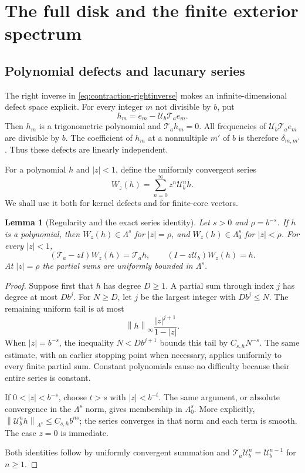 \documentclass[11pt,a4paper]{article}
\numberwithin{equation}{section}
\newtheorem{lemma}[theorem]{Lemma}
\theoremstyle{definition}
\theoremstyle{remark}
\newcommand{\Ta}{\mathcal T_a}
\newcommand{\Ub}{\mathcal U_b}
\newcommand{\norm}[1]{\left\lVert#1\right\rVert}
\newcommand{\smallspace}{\Lambda_0}
\begin{document}
\section{The full disk and the finite exterior spectrum}
\label{sec:spectrum}

\subsection{Polynomial defects and lacunary series}
The right inverse in \eqref{eq:contraction-rightinverse} makes an
infinite-dimensional defect space explicit. For every integer $m$ not
divisible by $b$, put
\begin{equation}
 h_m=e_m-\Ub\Ta e_m.
 \label{eq:polynomial-defect}
\end{equation}
Then $h_m$ is a trigonometric polynomial and $\Ta h_m=0$. All frequencies
of $\Ub\Ta e_m$ are divisible by $b$. The coefficient of $h_m$ at a
nonmultiple $m'$ of $b$ is therefore $\delta_{m,m'}$. Thus these defects
are linearly independent.

For a polynomial $h$ and $|z|<1$, define the uniformly convergent series
\begin{equation}
 W_z(h)=\sum_{n=0}^\infty z^n\Ub^n h.
 \label{eq:W}
\end{equation}
We shall use it both for kernel defects and for finite-core vectors.

\begin{lemma}[Regularity and the exact series identity]
\label{lem:W}
Let $s>0$ and $\rho=b^{-s}$.
If $h$ is a polynomial, then $W_z(h)\in\Lambda^s$ for $|z|=\rho$,
and $W_z(h)\in\smallspace^s$ for $|z|<\rho$.
For every $|z|<1$,
\begin{equation}
 (\Ta-zI)W_z(h)=\Ta h,
 \qquad (I-z\Ub)W_z(h)=h.
 \label{eq:W-identities}
\end{equation}
At $|z|=\rho$ the partial sums are uniformly bounded in $\Lambda^s$.
\end{lemma}
\begin{proof}
Suppose first that $h$ has degree $D\ge1$. A partial sum through index
$j$ has degree at most $Db^j$. For $N\ge D$, let $j$ be the largest
integer with $Db^j\le N$. The remaining uniform tail is at most
\[
 \norm h_\infty\frac{|z|^{j+1}}{1-|z|}.
\]
When $|z|=b^{-s}$, the inequality $N<Db^{j+1}$ bounds this tail by
$C_{s,h}N^{-s}$. The same estimate, with an earlier stopping point
when necessary, applies uniformly to every finite partial sum.
Constant polynomials cause no difficulty because their entire series
is constant.

If $0<|z|<b^{-s}$, choose $t>s$ with $|z|<b^{-t}$. The same argument,
or absolute convergence in the $\Lambda^s$ norm, gives membership in
$\smallspace^s$. More explicitly,
$\norm{\Ub^n h}_{\Lambda^s}\le C_{s,h}b^{ns}$; the series converges
in that norm and each term is smooth. The case $z=0$ is immediate.

Both identities follow by uniformly convergent summation and
$\Ta\Ub^n=\Ub^{n-1}$ for $n\ge1$.
\end{proof}
\end{document}
